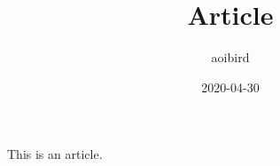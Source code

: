 \documentclass{article}
\title{Article}
\author{aoibird}
\date{2020-04-30}
\begin{document}
\maketitle

This is an article.
\end{document}
